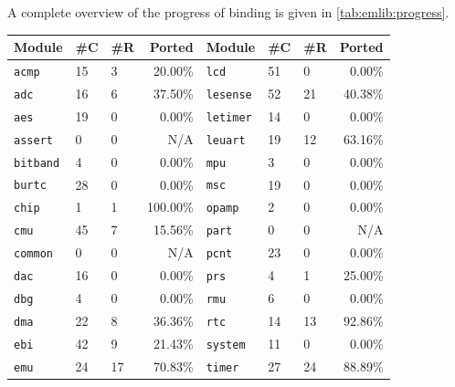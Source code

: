 A complete overview of the progress of binding {\emlib} is given in \autoref{tab:emlib:progress}.

\newcommand{\low}{\cellcolor{red!25}}
\newcommand{\medium}{\cellcolor{yellow!25}}
\newcommand{\high}{\cellcolor{green!25}}

\begin{table}[H]
  \centering
  \begin{tabular}{l | l | l | r | l | l | l | r }
    \textbf{Module} & \textbf{\#C} & \textbf{\#R} & \textbf{Ported} & \textbf{Module} & \textbf{\#C} & \textbf{\#R} & \textbf{Ported} \\

    \hline
    \texttt{acmp}    & 15 & 3  & {\low}    20.00\% & \texttt{lcd}     & 51 &  0 & {\low}     0.00\% \\
    \texttt{adc}     & 16 & 6  & {\medium} 37.50\% & \texttt{lesense} & 52 & 21 & {\medium} 40.38\% \\
    \texttt{aes}     & 19 & 0  & {\low}     0.00\% & \texttt{letimer} & 14 &  0 & {\low}     0.00\% \\
    \texttt{assert}  & 0  & 0  &            N/A    & \texttt{leuart}  & 19 & 12 & {\medium} 63.16\% \\
    \texttt{bitband} & 4  & 0  & {\low}     0.00\% & \texttt{mpu}     &  3 &  0 & {\low}     0.00\% \\
    \texttt{burtc}   & 28 & 0  & {\low}     0.00\% & \texttt{msc}     & 19 &  0 & {\low}     0.00\% \\
    \texttt{chip}    & 1  & 1  & {\high}  100.00\% & \texttt{opamp}   &  2 &  0 & {\low}     0.00\% \\
    \texttt{cmu}     & 45 & 7  & {\low}    15.56\% & \texttt{part}    &  0 &  0 &            N/A    \\
    \texttt{common}  & 0  & 0  &            N/A    & \texttt{pcnt}    & 23 &  0 & {\low}     0.00\% \\
    \texttt{dac}     & 16 & 0  & {\low}     0.00\% & \texttt{prs}     &  4 &  1 & {\medium} 25.00\% \\
    \texttt{dbg}     & 4  & 0  & {\low}     0.00\% & \texttt{rmu}     &  6 &  0 & {\low}     0.00\% \\
    \texttt{dma}     & 22 & 8  & {\medium} 36.36\% & \texttt{rtc}     & 14 & 13 & {\high}   92.86\% \\
    \texttt{ebi}     & 42 & 9  & {\low}    21.43\% & \texttt{system}  & 11 &  0 & {\low}     0.00\% \\
    \texttt{emu}     & 24 & 17 & {\medium} 70.83\% & \texttt{timer}   & 27 & 24 & {\high}   88.89\% \\

\end{tabular}
\end{table}
